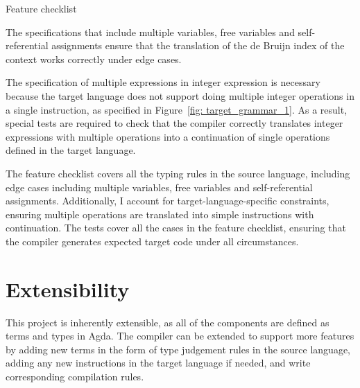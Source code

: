 \documentclass[12pt,a4paper]{report}
\theoremstyle{definition}
\begin{document}
\begin{table}[H]
        \caption{Feature checklist}
        \label{tab: feature_checklist}
    \end{table}

    The specifications that include multiple variables, free variables and self-referential assignments ensure that the translation of the de Bruijn index of the context works correctly under edge cases.

    The specification of multiple expressions in integer expression is necessary because the target language does not support doing multiple integer operations in a single instruction, as specified in Figure~\ref{fig: target_grammar_1}. As a result, special tests are required to check that the compiler correctly translates integer expressions with multiple operations into a continuation of single operations defined in the target language. 

    The feature checklist covers all the typing rules in the source language, including edge cases including multiple variables, free variables and self-referential assignments. Additionally, I account for target-language-specific constraints, ensuring multiple operations are translated into simple instructions with continuation. The tests cover all the cases in the feature checklist, ensuring that the compiler generates expected target code under all circumstances.

    \section{Extensibility}
    This project is inherently extensible, as all of the components are defined as terms and types in Agda. The compiler can be extended to support more features by adding new terms in the form of type judgement rules in the source language, adding any new instructions in the target language if needed, and write corresponding compilation rules.
\end{document}
